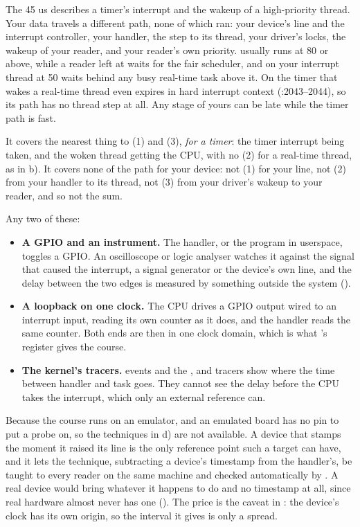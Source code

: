  The 45 us describes a timer's interrupt and the wakeup of a high-priority thread. Your
data travels a different path, none of which  ran: your device's line and the
interrupt controller, your handler, the step to its thread, your driver's locks, the wakeup of your
reader, and your reader's own priority.  usually runs at  80 or
above, while a reader left at  waits for the fair scheduler, and on
 your interrupt thread at 50 waits behind any busy real-time task above it. On
 the timer that wakes a real-time  thread even expires in hard
interrupt context (:2043--2044), so its path has no thread step at all.
Any stage of yours can be late while the timer path is fast.

 It covers the nearest thing to (1) and (3), \emph{for a timer}: the timer interrupt being
taken, and the woken thread getting the CPU, with no (2) for a real-time thread, as in b). It covers
none of the path for your device: not (1) for your line, not (2) from your handler to its thread,
not (3) from your driver's wakeup to your reader, and so not the sum.

 Any two of these:
\begin{itemize}
  \item \textbf{A GPIO and an instrument.} The handler, or the program in userspace, toggles a
    GPIO. An oscilloscope or logic analyser watches it against the signal that caused the
    interrupt, a signal generator or the device's own line, and the delay between the two edges is
    measured by something outside the system ().
  \item \textbf{A loopback on one clock.} The CPU drives a GPIO output wired to an interrupt input,
    reading its own counter as it does, and the handler reads the same counter. Both ends are then
    in one clock domain, which is what 's register gives the course.
  \item \textbf{The kernel's tracers.}  events and the ,
     and  tracers show where the time between handler and task
    goes. They cannot see the delay before the CPU takes the interrupt, which only an external
    reference can.
\end{itemize}

 Because the course runs on an emulator, and an emulated board has no pin to put a probe
on, so the techniques in d) are not available. A device that stamps the moment it raised its line
is the only reference point such a target can have, and it lets the technique, subtracting a
device's timestamp from the handler's, be taught to every reader on the same machine and checked
automatically by . A real device would bring whatever it happens to do and no
timestamp at all, since real hardware almost never has one (). The price is the
caveat in : the device's clock has its own origin, so the interval it gives is
only a spread.

